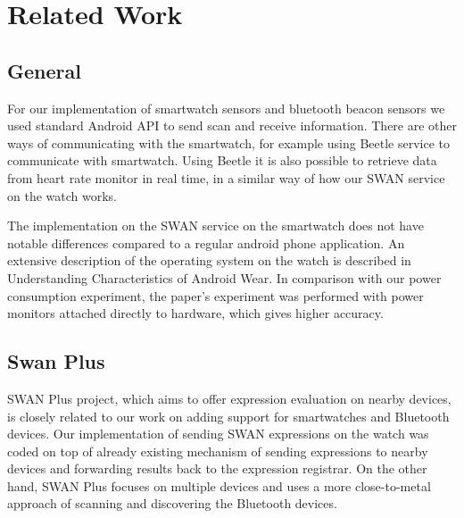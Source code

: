
\chapter{Related Work} %

\label{Chapter2} %



\section{General}
For our implementation of smartwatch sensors and bluetooth beacon sensors we used standard Android API to send scan and receive information.
There are other ways of communicating with the smartwatch, for example using Beetle\cite{beetle_mobisys16} service to communicate with smartwatch.
Using Beetle it is also possible to retrieve data from heart rate monitor in real time, in a similar way of how our SWAN service on the watch works.

The implementation on the SWAN service on the smartwatch does not have notable differences compared to a regular android phone application.
An extensive description of the operating system on the watch is described in Understanding Characteristics of Android Wear\cite{android_wear_char}.
In comparison with our power consumption experiment, the paper's experiment was performed  with power monitors attached 
directly to hardware, which gives higher accuracy.

\section{Swan Plus}
SWAN Plus project, which aims to offer expression evaluation on nearby devices, is closely related to our work on adding support for smartwatches and Bluetooth devices.
Our implementation of sending SWAN expressions on the watch was coded on top of already existing mechanism of sending expressions to nearby devices and forwarding results back to the expression
registrar. On the other hand, SWAN Plus focuses on multiple devices and uses a more close-to-metal approach of scanning and discovering the Bluetooth devices.

